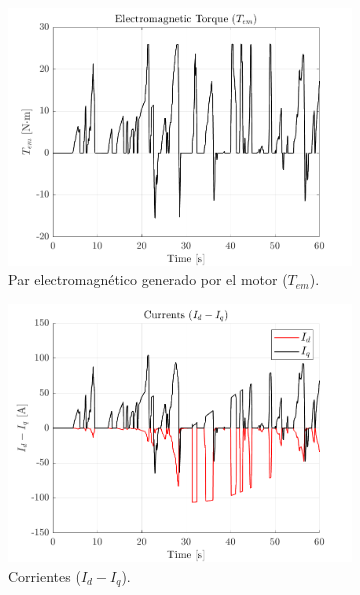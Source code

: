 \begin{figure}[!htb]
    \centering
    \begin{subfigure}{0.4\textwidth}
        \includegraphics[width=\linewidth]{fig/Tem_plot.png}
        \caption{Par electromagnético generado por el motor ($T_{em}$).}
    \end{subfigure}
    \begin{subfigure}{0.4\textwidth}
        \includegraphics[width=\linewidth]{fig/idiq_plot.png}
        \caption{Corrientes ($I_{d} - I_{q}$).}
    \end{subfigure}
    \begin{subfigure}{0.4\textwidth}

\end{subfigure}
\end{figure}
